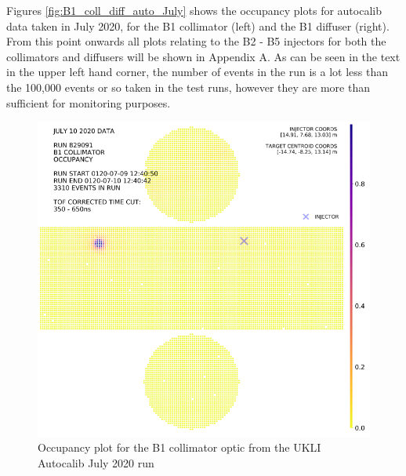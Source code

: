 Figures \ref{fig:B1_coll_diff_auto_July} shows the occupancy plots for autocalib data taken in July 2020, for the B1 collimator (left) and the B1 diffuser (right). From this point onwards all plots relating to the B2 - B5 injectors for both the collimators and diffusers will be shown in Appendix A. As can be seen in the text in the upper left hand corner, the number of events in the run is a lot less than the 100,000 events or so taken in the test runs, however they are more than sufficient for monitoring purposes.


\begin{figure}
    \centering
    
    \begin{minipage}{0.47\textwidth}
        \centering
        \includegraphics[width=\textwidth]{Figures/B1_occupancy_coll_auto.PNG} %
        \caption{Occupancy plot for the B1 collimator optic from the UKLI Autocalib July 2020 run}
    \end{minipage}\hfill
    \begin{minipage}{0.47\textwidth}
        \centering

\end{minipage}
\end{figure}
